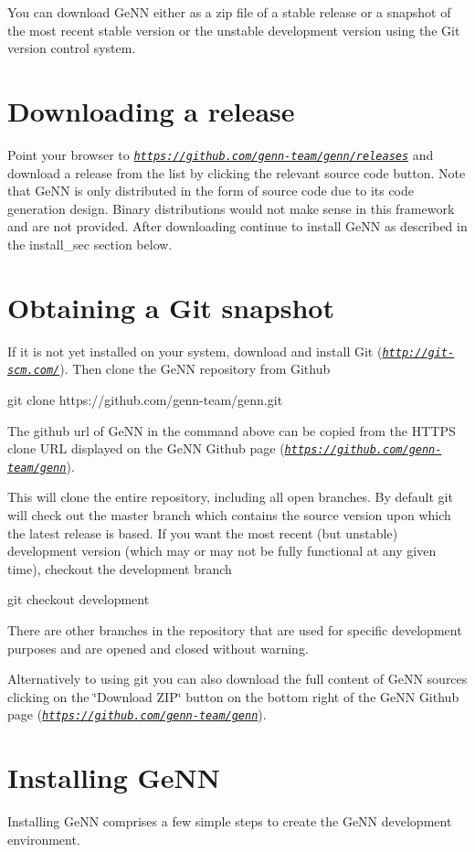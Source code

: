 You can download Ge\+N\+N either as a zip file of a stable release or a snapshot of the most recent stable version or the unstable development version using the Git version control system.\hypertarget{Installation_sec_Downloading_sec}{}\section{Downloading a release}\label{Installation_sec_Downloading_sec}
Point your browser to {\itshape \href{https://github.com/genn-team/genn/releases}{\tt https\+://github.\+com/genn-\/team/genn/releases}} and download a release from the list by clicking the relevant source code button. Note that Ge\+N\+N is only distributed in the form of source code due to its code generation design. Binary distributions would not make sense in this framework and are not provided. After downloading continue to install Ge\+N\+N as described in the install\+\_\+sec section below.\hypertarget{Installation_sec_GitSnapshot_sec}{}\section{Obtaining a Git snapshot}\label{Installation_sec_GitSnapshot_sec}
If it is not yet installed on your system, download and install Git ({\itshape \href{http://git-scm.com/}{\tt http\+://git-\/scm.\+com/}}). Then clone the Ge\+N\+N repository from Github 
\begin{DoxyCode}
git clone https:\textcolor{comment}{//github.com/genn-team/genn.git}
\end{DoxyCode}
 The github url of Ge\+N\+N in the command above can be copied from the H\+T\+T\+P\+S clone U\+R\+L displayed on the Ge\+N\+N Github page ({\itshape \href{https://github.com/genn-team/genn}{\tt https\+://github.\+com/genn-\/team/genn}}).

This will clone the entire repository, including all open branches. By default git will check out the master branch which contains the source version upon which the latest release is based. If you want the most recent (but unstable) development version (which may or may not be fully functional at any given time), checkout the development branch 
\begin{DoxyCode}
git checkout development
\end{DoxyCode}
 There are other branches in the repository that are used for specific development purposes and are opened and closed without warning.

Alternatively to using git you can also download the full content of Ge\+N\+N sources clicking on the \char`\"{}\+Download Z\+I\+P\char`\"{} button on the bottom right of the Ge\+N\+N Github page ({\itshape \href{https://github.com/genn-team/genn}{\tt https\+://github.\+com/genn-\/team/genn}}).\hypertarget{Installation_sec_installing_sec}{}\section{Installing Ge\+N\+N}\label{Installation_sec_installing_sec}
Installing Ge\+N\+N comprises a few simple steps to create the Ge\+N\+N development environment.

